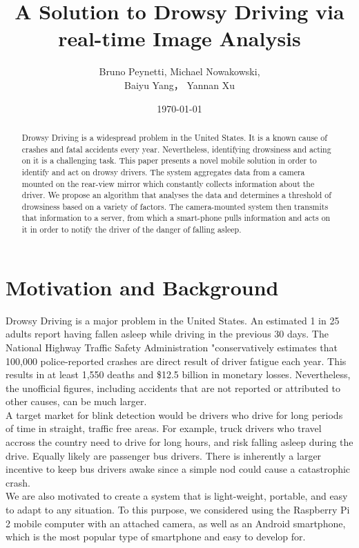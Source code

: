 \documentclass[twocolumn]{article}
\title{A Solution to Drowsy Driving via real-time Image Analysis}
\author{Bruno Peynetti, Michael Nowakowski, \\Baiyu Yang， Yannan Xu}
\date{\today}
\begin{document}
\maketitle



\begin{abstract}
Drowsy Driving is a widespread problem in the United States. It is a known cause of crashes and fatal accidents every year. Nevertheless, identifying drowsiness and acting on it is a challenging task. This paper presents a novel mobile solution in order to identify and act on drowsy drivers. The system aggregates data from a camera mounted on the rear-view mirror which constantly collects information about the driver. We propose an algorithm that analyses the data and determines a threshold of drowsiness based on a variety of factors. The camera-mounted system then transmits that information to a server, from which a smart-phone pulls information and acts on it in order to notify the driver of the danger of falling asleep. 
\end{abstract}

\section{Motivation and Background}
Drowsy Driving is a major problem in the United States. An estimated 1 in 25 adults report having fallen asleep while driving in the previous 30 days. The National Highway Traffic Safety Administration "conservatively estimates that 100,000 police-reported crashes are direct result of driver fatigue each year. This results in at least 1,550 deaths and \$12.5 billion in monetary losses. Nevertheless, the unofficial figures, including accidents that are not reported or attributed to other causes, can be much larger.  \\
A target market for blink detection would be drivers who drive for long periods of time in straight, traffic free areas. For example, truck drivers who travel accross the country need to drive for long hours, and risk falling asleep during the drive. Equally likely are passenger bus drivers. There is inherently a larger incentive to keep bus drivers awake since a simple nod could cause a catastrophic crash. \\
We are also motivated to create a system that is light-weight, portable, and easy to adapt to any situation. To this purpose, we considered using the Raspberry Pi 2 mobile computer with an attached camera, as well as an Android smartphone, which is the most popular type of smartphone and easy to develop for. 
\end{document}
